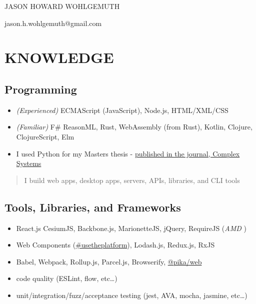 \documentclass[10pt]{article}
\def\tightlist{}
\begin{document}
\begin{center}\Huge {JASON HOWARD WOHLGEMUTH}\end{center}
\begin{center}jason.h.wohlgemuth@gmail.com\end{center}

\hypertarget{knowledge}{%
\section{KNOWLEDGE}\label{knowledge}}

\hypertarget{programming}{%
\subsection{Programming}\label{programming}}

\begin{itemize}
\tightlist
\item
  \emph{(Experienced)} ECMAScript (JavaScript), Node.js, HTML/XML/CSS
\item
  \emph{(Familiar)} F\# ReasonML, Rust, WebAssembly (from Rust), Kotlin,
  Clojure, ClojureScript, Elm
\item
  I used Python for my Masters thesis -
  \href{https://www.complex-systems.com/abstracts/v23_i03_a01/}{published
  in the journal, Complex Systems}
\end{itemize}

\begin{quote}
I build web apps, desktop apps, servers, APIs, libraries, and CLI tools
\end{quote}

\hypertarget{tools-libraries-and-frameworks}{%
\subsection{Tools, Libraries, and
Frameworks}\label{tools-libraries-and-frameworks}}

\begin{itemize}
\tightlist
\item
  React.js CesiumJS, Backbone.js, MarionetteJS, jQuery, RequireJS
  (\emph{AMD })
\item
  Web Components
  (\href{https://twitter.com/hashtag/usetheplatform?src=hash}{\#usetheplatform}),
  Lodash.js, Redux.js, RxJS
\item
  Babel, Webpack, Rollup.js, Parcel.js, Browserify,
  \href{https://www.pika.dev/blog/pika-web-a-future-without-webpack/}{@pika/web}
\item
  code quality (ESLint, flow, etc\ldots{})
\item
  unit/integration/fuzz/acceptance testing (jest, AVA, mocha, jasmine,
  etc\ldots{})
\end{itemize}
\end{document}

